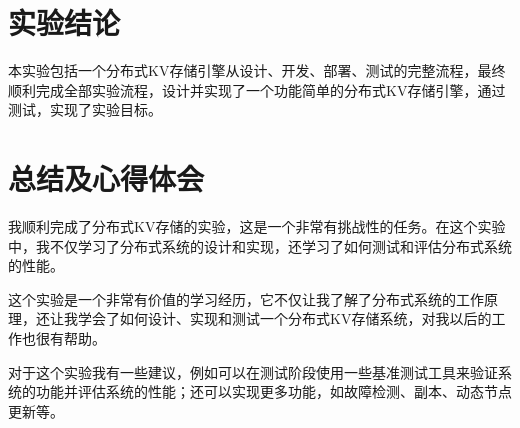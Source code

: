 \section{实验结论}

本实验包括一个分布式KV存储引擎从设计、开发、部署、测试的完整流程，最终顺利完成全部实验流程，设计并实现了一个功能简单的分布式KV存储引擎，通过测试，实现了实验目标。

\section{总结及心得体会}

我顺利完成了分布式KV存储的实验，这是一个非常有挑战性的任务。在这个实验中，我不仅学习了分布式系统的设计和实现，还学习了如何测试和评估分布式系统的性能。

这个实验是一个非常有价值的学习经历，它不仅让我了解了分布式系统的工作原理，还让我学会了如何设计、实现和测试一个分布式KV存储系统，对我以后的工作也很有帮助。

对于这个实验我有一些建议，例如可以在测试阶段使用一些基准测试工具来验证系统的功能并评估系统的性能；还可以实现更多功能，如故障检测、副本、动态节点更新等。
